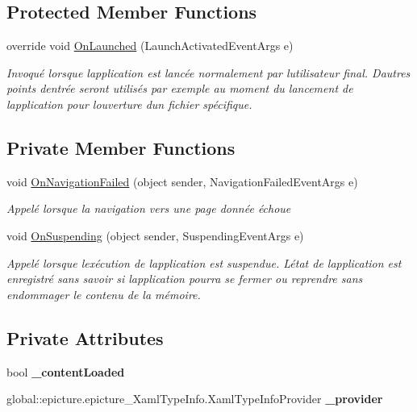 \subsection*{Protected Member Functions}
\begin{DoxyCompactItemize}
\item 
override void \mbox{\hyperlink{classepicture_1_1_app_a588834872f8c75103ef6b5ccb117e6fb}{On\+Launched}} (Launch\+Activated\+Event\+Args e)
\begin{DoxyCompactList}\small\item\em Invoqué lorsque l\textquotesingle{}application est lancée normalement par l\textquotesingle{}utilisateur final. D\textquotesingle{}autres points d\textquotesingle{}entrée seront utilisés par exemple au moment du lancement de l\textquotesingle{}application pour l\textquotesingle{}ouverture d\textquotesingle{}un fichier spécifique. \end{DoxyCompactList}\end{DoxyCompactItemize}
\subsection*{Private Member Functions}
\begin{DoxyCompactItemize}
\item 
void \mbox{\hyperlink{classepicture_1_1_app_a9878a4687b9b9dc2e7d24cd2501fd2c3}{On\+Navigation\+Failed}} (object sender, Navigation\+Failed\+Event\+Args e)
\begin{DoxyCompactList}\small\item\em Appelé lorsque la navigation vers une page donnée échoue \end{DoxyCompactList}\item 
void \mbox{\hyperlink{classepicture_1_1_app_afc42747b09fad5af9daba6e0121ced9a}{On\+Suspending}} (object sender, Suspending\+Event\+Args e)
\begin{DoxyCompactList}\small\item\em Appelé lorsque l\textquotesingle{}exécution de l\textquotesingle{}application est suspendue. L\textquotesingle{}état de l\textquotesingle{}application est enregistré sans savoir si l\textquotesingle{}application pourra se fermer ou reprendre sans endommager le contenu de la mémoire. \end{DoxyCompactList}\end{DoxyCompactItemize}
\subsection*{Private Attributes}
\begin{DoxyCompactItemize}
\item 
\mbox{\label{classepicture_1_1_app_aef10db95121bd3a4a1c55676e8a522ad}} 
bool {\bfseries \+\_\+content\+Loaded}
\item 
\mbox{\label{classepicture_1_1_app_a8e79716acf270b1061eb1e47cb452044}} 
global\+::epicture.\+epicture\+\_\+\+Xaml\+Type\+Info.\+Xaml\+Type\+Info\+Provider {\bfseries \+\_\+provider}
\end{DoxyCompactItemize}


